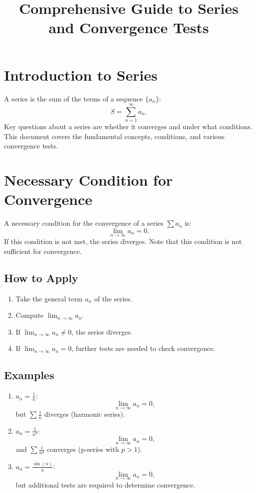 \documentclass[a4paper, 12pt]{article}
\title{Comprehensive Guide to Series and Convergence Tests}
\author{}
\date{}
\begin{document}
\maketitle

\section*{Introduction to Series}
A series is the sum of the terms of a sequence \( \{a_n\} \):
\[
S = \sum_{n=1}^\infty a_n.
\]
Key questions about a series are whether it converges and under what conditions. This document covers the fundamental concepts, conditions, and various convergence tests.

\section{Necessary Condition for Convergence}
A necessary condition for the convergence of a series \(\sum a_n\) is:
\[
\lim_{n \to \infty} a_n = 0.
\]
If this condition is not met, the series diverges. Note that this condition is not sufficient for convergence.

\subsection*{How to Apply}
\begin{enumerate}
    \item Take the general term \(a_n\) of the series.
    \item Compute \(\lim_{n \to \infty} a_n\).
    \item If \(\lim_{n \to \infty} a_n \neq 0\), the series diverges.
    \item If \(\lim_{n \to \infty} a_n = 0\), further tests are needed to check convergence.
\end{enumerate}

\subsection*{Examples}
\begin{enumerate}
    \item \(a_n = \frac{1}{n}\):
    \[\lim_{n \to \infty} a_n = 0,\]
    but \(\sum \frac{1}{n}\) diverges (harmonic series).
    
    \item \(a_n = \frac{1}{n^2}\):
    \[\lim_{n \to \infty} a_n = 0,\]
    and \(\sum \frac{1}{n^2}\) converges (p-series with \(p > 1\)).

    \item \(a_n = \frac{\sin(n)}{n}\):
    \[\lim_{n \to \infty} a_n = 0,\]
    but additional tests are required to determine convergence.
\end{enumerate}
\end{document}
